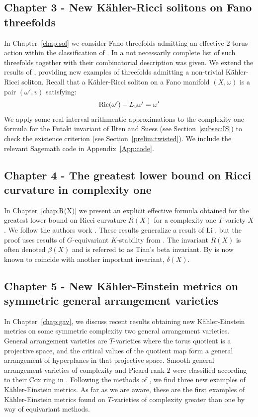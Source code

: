 \subsection*{Chapter 3 - New K\"ahler-Ricci solitons on Fano threefolds} \label{content:riccisolitons}
In Chapter~\ref{chap:sol} we consider Fano threefolds admitting an effective \(2\)-torus action within the classification of \cite{mori1981classification}. In \cite{suss2013fano} a not necessarily complete list of such threefolds together with their combinatorial description was given. We extend the results of \cite{ilten2015}, providing new examples of threefolds admitting a non-trivial K\"ahler-Ricci soliton. Recall that a K\"ahler-Ricci soliton on a Fano manifold \((X,\omega)\) is a pair \((\omega',v)\) satisfying:
\[
\mathop{\rm Ric}\nolimits(\omega') - L_v \omega' = \omega'
\]
We apply some real interval arithmentic approximations to the complexity one formula for the Futaki invariant of Ilten and Suess (see Section~\ref{subsec:IS}) to check the existence criterion \cite{datar2016kahler} (see Section~\ref{prelim:twisted}). We include the relevant Sagemath code in Appendix~\ref{App:code}.
\subsection*{Chapter 4 - The greatest lower bound on Ricci curvature in complexity one} \label{content:R(X)}
In Chapter~\ref{chap:R(X)} we present an explicit effective formula obtained for the greatest lower bound on Ricci curvature \(R(X)\) for a complexity one \(T\)-variety \(X\). We follow the authors work \cite{cable2019greatest}. These results generalize a result of Li \cite{li2009greatest}, but the proof uses results of \(G\)-equivariant \(K\)-stability from \cite{datar2016kahler}. The invariant \(R(X)\) is often denoted \(\beta(X)\) and is referred to as Tian's beta invariant. By \cite{} is now known to coincide with another important invariant, \(\delta(X)\).
\subsection*{Chapter 5 - New K\"ahler-Einstein metrics on symmetric general arrangement varieties} \label{content:generalarrangement}
In Chapter~\ref{chap:gav}, we discuss recent results obtaining new K\"ahler-Einstein metrics on some symmetric complexity two general arrangement varieties. General arrangement varieties are \(T\)-varieties where the torus quotient is a projective space, and the critical values of the quotient map form a general arrangement of hyperplanes in that projective space. Smooth general arrangement varieties of complexity and Picard rank \(2\) were classified according to their Cox ring in \cite{hausen2018torus}. Following the methods of \cite{Su13}, we find three new examples of K\"ahler-Einstein metrics. As far as we are aware, these are the first examples of K\"ahler-Einstein metrics found on \(T\)-varieties of complexity greater than one by way of equivariant methods.
